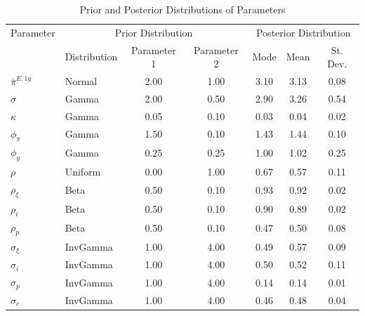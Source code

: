 \documentclass{article}
\renewcommand{\arraystretch}{2}
\begin{document}
\renewcommand{\arraystretch}{1}

\begin{table}
	\caption{Prior and Posterior Distributions of Parameters}
	\begin{center}
\begin{tabularx}{0.8\textwidth}{llccccc} 
\hline 
Parameter& \multicolumn{3}{c}{Prior Distribution} & \multicolumn{3}{c}{Posterior Distribution} \\ 
& Distribution &Parameter 1& Parameter 2& Mode & Mean & St. Dev.\\ 
\hline 
$\bar{\pi}^{E,1y}      $ & Normal                                                       & 2.00& 1.00& 3.10& 3.13& 0.08  \\ 
$\sigma                $ & Gamma                                                        & 2.00& 0.50& 2.90& 3.26& 0.54  \\ 
$\kappa                $ & Gamma                                                        & 0.05& 0.10& 0.03& 0.04& 0.02  \\ 
$\phi_\pi              $ & Gamma                                                        & 1.50& 0.10& 1.43& 1.44& 0.10  \\ 
$\phi_y                $ & Gamma                                                        & 0.25& 0.25& 1.00& 1.02& 0.25  \\ 
$\rho                  $ & Uniform                                                      & 0.00& 1.00& 0.67& 0.57& 0.11  \\ 
$\rho_\xi              $ & Beta                                                         & 0.50& 0.10& 0.93& 0.92& 0.02  \\ 
$\rho_i                $ & Beta                                                         & 0.50& 0.10& 0.90& 0.89& 0.02  \\ 
$\rho_p                $ & Beta                                                         & 0.50& 0.10& 0.47& 0.50& 0.08  \\ 
$\sigma_\xi            $ & InvGamma                                                     & 1.00& 4.00& 0.49& 0.57& 0.09  \\ 
$\sigma_i              $ & InvGamma                                                     & 1.00& 4.00& 0.50& 0.52& 0.11  \\ 
$\sigma_p              $ & InvGamma                                                     & 1.00& 4.00& 0.14& 0.14& 0.01  \\ 
$\sigma_e              $ & InvGamma                                                     & 1.00& 4.00& 0.46& 0.48& 0.04  \\ 

\end{tabularx}
\end{center}
\end{table}
\end{document}

